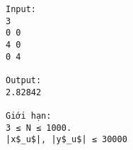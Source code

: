 \begin{verbatim}
Input:
3
0 0
4 0
0 4

Output:
2.82842

Giới hạn:
3 ≤ N ≤ 1000. 
|x$_u$|, |y$_u$| ≤ 30000

\end{verbatim}